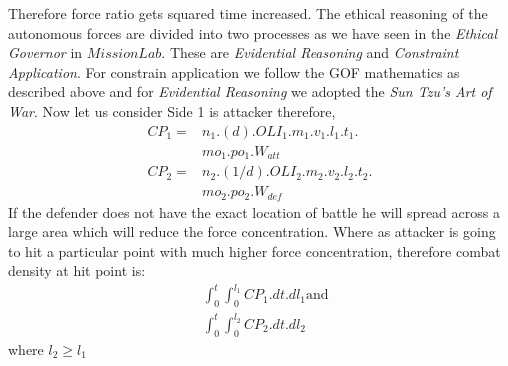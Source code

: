 \documentclass[]{article}
\begin{document}
Therefore force ratio gets squared time increased. The ethical reasoning of the autonomous forces are divided into two processes as we have seen in the \emph{Ethical Governor} in $MissionLab$\autocite{lethalRobots}. These are \emph{Evidential Reasoning} and \emph{Constraint Application}. For constrain application we follow the GOF mathematics as described above and for \emph{Evidential Reasoning} we adopted the \emph{Sun Tzu's Art of War}. 
Now let us consider Side 1 is attacker therefore,
\begin{equation}
\begin{split}
    CP_1=&n_1.(d).OLI_1.m_1.v_1.l_1.t_1.\\&mo_1.po_1.W_{att}\\
    CP_2=&n_2.(1/d).OLI_2.m_2.v_2.l_2.t_2.\\&mo_2.po_2.W_{def}
\end{split}
\end{equation}
If the defender does not have the exact location of battle he will spread across a large area which will reduce the force concentration. Where as attacker is going to hit a particular point with much higher force concentration, therefore combat density at hit point is:
\begin{equation}
\begin{split}
    &\int_0^{t}\int_0^{l_1}CP_1.dt.dl_1 \text{and} \\&\int_0^{t}\int_0^{l_2}CP_2.dt.dl_2
\end{split} 
\end{equation}
where $l_2\geq l_1$
\end{document}
